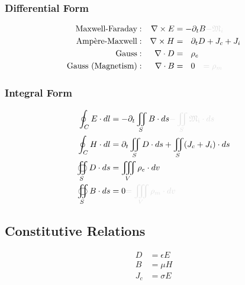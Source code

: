 \documentclass{article}
\begin{document}
\subsubsection*{Differential Form}
    \begin{subequations}\label{eq:Maxwell}
        \begin{align}
            \text{Maxwell-Faraday} & : & \nabla \times E &= - \partial_t B \begingroup \textcolor{vanish}{- \mathfrak{M}_i } \endgroup \label{eq:MaxwellFaraday} \\
            \text{Amp\`ere-Maxwell} & : & \nabla \times H &= \ \ \partial_t D + J_{c} + J_{i} \label{eq:AmpereMaxwell} \\
            \text{Gauss} & : & \nabla \cdot D &= \ \ \rho_e \label{eq:GaussElectric} \\
            \text{Gauss (Magnetism)} & : & \nabla \cdot B &= \ \ 0 \begingroup \textcolor{vanish}{\quad = \rho_m} \endgroup \label{eq:GaussMagnetic}
        \end{align}
    \end{subequations}
\subsubsection*{Integral Form}
    \begin{subequations}\label{eq:MaxwellIntegral}
        \begin{align}
            \oint_C E \cdot dl &=  - \partial_t \iint_S B \cdot ds \begingroup \textcolor{vanish}{- \iint_S \mathfrak{M_i} \cdot ds} \endgroup \label{eq:MaxwellFaradayIntegral} \\
            \oint_C H \cdot dl &=  \partial_t \iint_S D \cdot ds + \iint_S ( J_c + J_i ) \cdot ds \label{eq:AmpereMaxwellIntegral} \\
            \oiint_S D \cdot ds &= \iiint_V \rho_e \cdot dv \label{eq:GaussElectricIntegral} \\
            \oiint_S B \cdot ds &= 0 \begingroup \textcolor{vanish}{= \iiint_V \rho_m \cdot dv} \endgroup \label{eq:GaussMagneticIntegral}
        \end{align}
    \end{subequations}
\subsection{Constitutive Relations} 
    \begin{subequations}\label{eq:Constitutive}
        \begin{align}
            D &= \epsilon E \label{eq:ConstitutiveElectric} \\ 
            B &= \mu H \label{eq:ConstitutiveMagnetic} \\
            J_c &= \sigma E \label{eq:ConstitutiveCurrentDensity}
        \end{align}
    \end{subequations}
\end{document}
